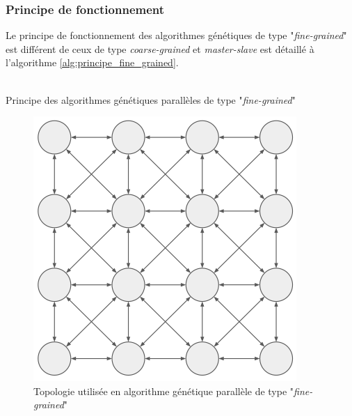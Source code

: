 \documentclass[12pt,a4paper]{article}
\begin{document}
	\subsubsection{Principe de fonctionnement}
	Le principe de fonctionnement des algorithmes génétiques de type "\emph{fine-grained}" est différent de ceux de type \emph{coarse-grained} et \emph{master-slave} est détaillé à l'algorithme \ref{alg:principe_fine_grained}. \\
	\\
	\begin{algorithm}[H]
		\label{alg:principe_fine_grained}
 		\caption{Principe des algorithmes génétiques parallèles de type "\emph{fine-grained}"}
 		\BlankLine
 		\BlankLine
	\end{algorithm}
	
	\begin{figure}[!h]
		\begin{center}
			\includegraphics[scale=.3]{img/fine_grained_fig.png}
			\caption{Topologie utilisée en algorithme génétique parallèle de type "\emph{fine-grained}"}
			\label{fig:fine_grained_fig}
		\end{center}
	\end{figure} 
	
\end{document}
